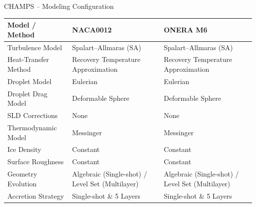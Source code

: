 
\begin{frame}[c]{\small CHAMPS -- Modeling Configuration}
\scriptsize

\centering

\renewcommand{\arraystretch}{1.45}
\setlength{\tabcolsep}{5pt}

\begin{tabularx}{0.97\textwidth}{
    >{\centering\arraybackslash}p{}
    >{\centering\arraybackslash}X
    >{\centering\arraybackslash}X
}
\hline
\rowcolor{blue!65!black}
\color{white}\textbf{Model / Method} &
\color{white}\textbf{NACA0012} &
\color{white}\textbf{ONERA M6} \\
\hline

Turbulence Model &
Spalart--Allmaras (SA) &
Spalart--Allmaras (SA) \\
\hline

Heat-Transfer Method &
Recovery Temperature Approximation &
Recovery Temperature Approximation \\
\hline

Droplet Model &
Eulerian &
Eulerian \\
\hline

Droplet Drag Model &
Deformable Sphere &
Deformable Sphere \\
\hline

SLD Corrections &
None &
None \\
\hline

Thermodynamic Model &
Messinger &
Messinger \\
\hline

Ice Density &
Constant &
Constant \\
\hline

Surface Roughness &
Constant &
Constant \\
\hline

Geometry Evolution &
Algebraic (Single-shot) / Level Set (Multilayer) &
Algebraic (Single-shot) / Level Set (Multilayer) \\
\hline

Accretion Strategy &
Single-shot \& 5 Layers &
Single-shot \& 5 Layers \\
\hline

\end{tabularx}

\end{frame}

